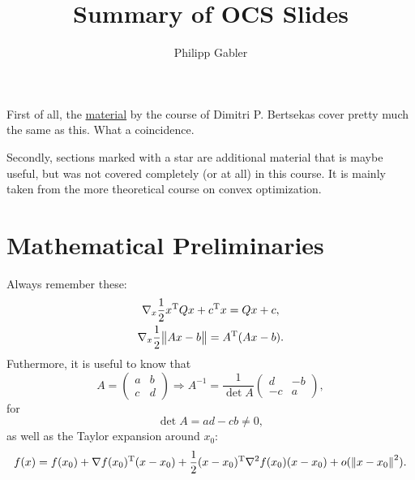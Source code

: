 \documentclass{article}
\title{Summary of OCS Slides}
\author{Philipp Gabler}
\begin{document}
\maketitle

\tableofcontents
\newpage


\noindent First of all, the \href{http://web.mit.edu/6.252/www/LectureNotes/}{material} by the
course of Dimitri P. Bertsekas cover pretty much the same as this. What a coincidence.

Secondly, sections marked with a star are additional material that is maybe useful, but was not
covered completely (or at all) in this course.  It is mainly taken from the more theoretical course
on convex optimization.

\section{Mathematical Preliminaries}


\label{s:basics}

Always remember these:
\begin{gather*}
  \nabla_x \frac{1}{2} \T{x}Qx + \T{c}x = Qx + c, \\
  \nabla_x \frac{1}{2} \enVert[1]{Ax - b} = \T{A}(Ax - b).
\end{gather*}
Futhermore, it is useful to know that
\begin{equation*}
  A = \begin{pmatrix}
    a & b \\
    c & d
  \end{pmatrix} \Rightarrow A^{-1} = \frac{1}{\det A}
  \begin{pmatrix}
    d & -b \\
    -c & a
  \end{pmatrix},
\end{equation*}
for
\begin{equation*}
  \det A = ad - cb \neq 0,
\end{equation*}
as well as the Taylor expansion around \(x_0\):
\begin{equation*}
  f(x) = f(x_0) + \T{\nabla f(x_0)}(x - x_0) + \frac{1}{2} \T{(x - x_0)}\nabla^2 f(x_0)(x - x_0)
  + o(\,\enVert{x - x_0}^2).
\end{equation*}


\end{document}
